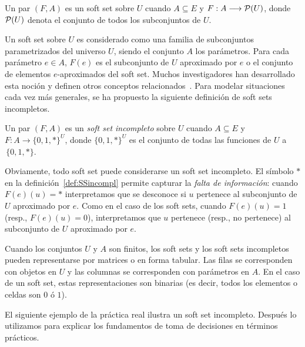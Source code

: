 \begin{definition}
Un par $(F,A)$ es un soft set sobre $U$ cuando $A\subseteq E$ y $F: A \longrightarrow {\cal P}(U)$, donde ${\cal P}(U)$ denota el conjunto de todos los subconjuntos de $U$.
\end{definition}

Un soft set sobre $U$ es considerado como una familia de subconjuntos parametrizados del universo $U$, siendo el conjunto $A$ los parámetros. Para cada parámetro $e\in A$, $F(e)$ es el subconjunto de $U$ aproximado por $e$ o el conjunto de elementos $e$-aproximados del soft set. Muchos investigadores han desarrollado esta noción y definen otros conceptos relacionados~\citep{MajiBR03,FengLi}.
Para modelar situaciones cada vez más generales, se ha propuesto la siguiente definición de soft sets incompletos.



\begin{definition}\label{def:SSincompl}
Un par $(F,A)$ es un \textit{soft set incompleto} sobre $U$ cuando $A\subseteq E$ y $F: A \longrightarrow \{0, 1, *\}^U$, donde $\{0, 1, *\}^U$ es el conjunto de todas las funciones de $U$ a $\, \{0, 1, *\}$. 
\end{definition}

Obviamente, todo soft set puede considerarse un soft set incompleto. El símbolo $*$ en la definición~\ref{def:SSincompl} permite capturar la \textit{falta de información}: cuando $F(e)(u)=*$ interpretamos que se desconoce si $u$ pertenece al subconjunto de $U$ aproximado por $e$. Como en el caso de los soft sets, cuando $F(e)(u)=1$ (resp., $F(e)(u)=0$), interpretamos que $u$ pertenece (resp., no pertenece) al subconjunto de $U$ aproximado por $e$. 
\smallskip

Cuando los conjuntos $U$ y $A$ son finitos, los soft sets y los soft sets incompletos pueden representarse por matrices o en forma tabular. Las filas se corresponden con objetos en $U$ y las columnas se corresponden con parámetros en $A$. En el caso de un soft set, estas representaciones son binarias (es decir, todos los elementos o celdas son $0$ ó $1$).

El siguiente ejemplo de la práctica real ilustra un soft set incompleto. Después lo utilizamos para explicar los fundamentos de toma de decisiones en términos prácticos. 

